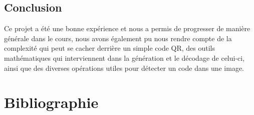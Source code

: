 \documentclass{report}
\begin{document}
	\section{Conclusion}

	Ce projet a été une bonne expérience et nous a permis de progresser de manière générale dans le cours, nous avons également pu nous rendre compte de la complexité qui peut se cacher derrière un simple code QR, des outils mathématiques qui interviennent dans la génération et le décodage de celui-ci, ainsi que des diverses opérations utiles pour détecter un code dans une image.\\

\chapter{Bibliographie}

\end{document}
